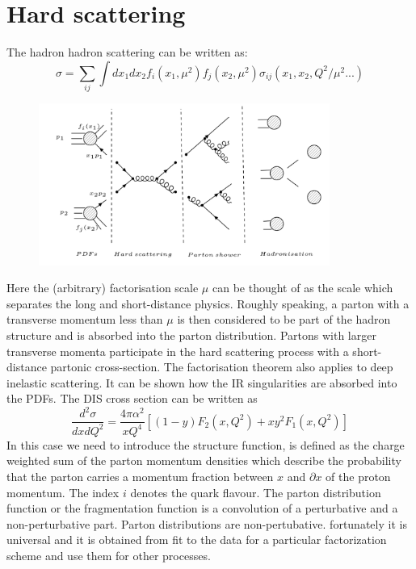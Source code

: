 \section{Hard scattering}
The hadron hadron scattering can be written as:
\begin{equation}
\sigma = \sum_{ij} \int dx_1 dx_2 f_i(x_1, \mu^2)f_j(x_2, \mu^2) \sigma_{ij}(x_1, x_2, Q^2/\mu^2... )
\end{equation}
\begin{figure}[h!]
\centering
\includegraphics[width=0.85\textwidth]{images/Intro/Hard.png}
\end{figure}
Here the (arbitrary) factorisation scale $ \mu $ can be thought of
as the scale which separates the long and short-distance physics.
Roughly speaking, a parton with a transverse momentum less
than $ \mu $ is then considered to be part of the hadron structure and
is absorbed into the parton distribution. Partons with larger transverse momenta participate in the hard scattering process with a short-distance partonic cross-section.
The factorisation theorem also applies to deep inelastic scattering. It can be shown how the IR singularities are absorbed into the PDFs. The DIS cross section can be written as ~\cite{Ellis:1991qj}
\begin{equation}
\frac{d^2 \sigma}{dx dQ^2}=\frac{4\pi \alpha^2}{x Q^4}[(1-y)F_2 (x, Q^2)+xy^2 F_1(x, Q^2)]
\end{equation}
In this case we need to introduce the structure function, is defined as the charge weighted sum of the parton momentum densities which describe the probability that the parton carries a momentum
fraction between $ x $ and $ \partial x $ of the proton momentum. The index $i$ denotes the quark flavour. The parton distribution function or the fragmentation function is a convolution of a perturbative and a non-perturbative part. Parton distributions are non-pertubative. fortunately it is universal and it is obtained from fit to the data for a particular factorization scheme and use them for other processes.

